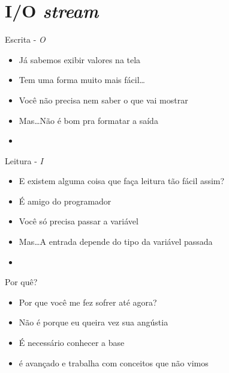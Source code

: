 \documentclass[14pt]{beamer}
\subtitle{Funcional}
\begin{document}
	
	\begin{frame}
		\titlepage
	\end{frame}

	\begin{frame}
		\tableofcontents
	\end{frame}

	\section{I/O \textit{stream}}
	\begin{frame}{Escrita - \textit{O}}
		\begin{itemize}
			\presentationPause\item Já sabemos exibir valores na tela
			\presentationPause\item Tem uma forma muito mais fácil\dots
			\presentationPause\item Você não precisa nem saber o que vai mostrar
			\presentationPause\item Mas\dots  \presentationPause Não é bom pra formatar a saída
			\presentationPause\item \basicCode{cout}
		\end{itemize}
		\presentationPause
	\end{frame}

	\begin{frame}{Leitura - \textit{I}}
		\begin{itemize}
			\presentationPause\item E existem alguma coisa que faça leitura tão fácil assim?
			\presentationPause\item É amigo do programador
			\presentationPause\item Você só precisa passar a variável
			\presentationPause\item Mas\dots  \presentationPause A entrada depende do tipo da variável passada
			\presentationPause\item \basicCode{cin}  
		\end{itemize}
		\presentationPause
	\end{frame}

	\begin{frame}{Por quê?}
		\begin{itemize}
			\presentationPause\item Por que você me fez sofrer até agora?
			\presentationPause\item Não é porque eu queira vez sua angústia
			\presentationPause\item É necessário conhecer a base
			\presentationPause\item {} é avançado e trabalha com conceitos que não vimos
		\end{itemize}
	\end{frame}
\end{document}
